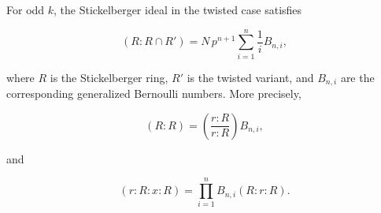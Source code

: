 For odd $k$, the Stickelberger ideal in the twisted case satisfies

$$
(R : R \cap R') = N\, p^{n+1} \sum_{i=1}^{n} \frac{1}{i} B_{n,i},
$$

where $R$ is the Stickelberger ring, $R'$ is the twisted variant, and $B_{n,i}$ are the corresponding generalized Bernoulli numbers. More precisely,

$$
(R : R) = \left(\frac{r : R}{r : R}\right) B_{n,i},
$$

and

$$
(r : R : x : R) = \prod_{i=1}^{n} B_{n,i} (R : r : R).
$$